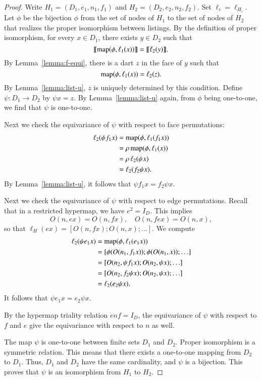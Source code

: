 \begin{proof} 
  Write $H_1 =(D_1,e_1,n_1,f_1)$ and $H_2=(D_2,e_2,n_2,f_2)$.  Set
  $\ell_i = \ell_{H_i}$.  Let $\phi$ be the  bijection $\phi$
  from the set of nodes of $H_1$ to the set of nodes of $H_2$ that
  realizes the proper isomorphism between listings.  By the definition
  of proper isomorphism, for every $x\in D_1$, there exists $y\in D_2$
  such that
\[
{\llbracket{{\operatorname{map}}(\phi,\ell_{1}(x))}\rrbracket} = {\llbracket{\ell_{2}(y)}\rrbracket}.
\]
By Lemma~\ref{lemma:f-equi}, there is a dart $z$ in the face of $y$ such that
\[
{\operatorname{map}}(\phi,\ell_{1}(x)) = \ell_{2}(z).
\]
By Lemma~\ref{lemma:list-u}, $z$ is uniquely determined by this
condition.  Define $\psi:D_1\to D_2$ by $\psi x = z$.  By
Lemma~\ref{lemma:list-u} again, from $\phi$ being one-to-one, we find
that $\psi$ is one-to-one.

Next we check the equivariance of $\psi$ with respect to face permutations:
\begin{align*}
\ell_{2}(\psi f_1 x) &= {\operatorname{map}}(\phi,\ell_{1}(f_1 x)) \\
   &= \rho\, {\operatorname{map}}(\phi,\ell_{1} (x)) \\
   &= \rho\, \ell_{2}(\psi x)\\
   &= \ell_2(f_2 \psi x).
\end{align*}
By Lemma~\ref{lemma:list-u}, it follows that $\psi f_1 x = f_2 \psi x$.

Next we check the equivariance of $\psi$ with respect to edge
permutations.  Recall that in a restricted hypermap, we have
$e^2=I_D$.  This implies
\[
O(n,e x) =  O(n,f x),\quad
O(n,f e x) = O(n,x),
\]
so that $\ell_H(e x) = [O(n,f x);O(n,x);\ldots]$.  We compute
\begin{align*}
\ell_2(\psi e_1 x) &= {\operatorname{map}}(\phi,\ell_1(e_1 x)) \\
  &= [\phi(O(n_1,f_1 x));\phi(O(n_1,x));\ldots]\\
  &= [O(n_2,\psi f_1 x);O(n_2,\psi x);\ldots]\\
  &= [O(n_2,f_2\psi x);O(n_2,\psi x);\ldots]\\
   &=\ell_2(e_2 \psi x).
\end{align*}
It follows that $\psi e_1 x = e_2 \psi x$.

By the hypermap triality relation $e n f = I_D$, the equivariance of
$\psi$ with respect to $f$ and $e$ give the equivariance with respect
to $n$ as well.

The map $\psi$ is one-to-one between finite sets $D_1$ and $D_2$.
Proper isomorphism is a symmetric relation.  This means that there
exists a one-to-one mapping from $D_2$ to $D_1$.  Thus, $D_1$ and
$D_2$ have the same cardinality, and $\psi$ is a bijection.  This
proves that $\psi$ is an isomorphism from $H_1$ to $H_2$.
\end{proof}

